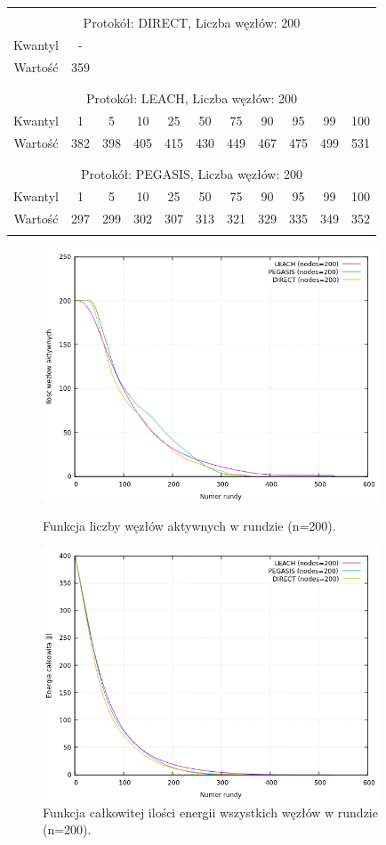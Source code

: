 \documentclass[a4paper,12pt,twoside,openany]{report}
\begin{document}
\begin{longtable}{*{11}{c}}
\toprule \\*
\multicolumn{11}{c}{Protokół: DIRECT, Liczba węzłów: 200} \\*
Kwantyl	& -	\\*
Wartość	& 359	\\*
\midrule \\*
\\*
\multicolumn{11}{c}{Protokół: LEACH, Liczba węzłów: 200} \\*
Kwantyl	& 1	& 5	& 10	& 25	& 50	& 75	& 90	& 95	& 99	& 100	\\*
Wartość	& 382	& 398	& 405	& 415	& 430	& 449	& 467	& 475	& 499	& 531	\\*
\midrule \\*
\\*
\multicolumn{11}{c}{Protokół: PEGASIS, Liczba węzłów: 200} \\*
Kwantyl	& 1	& 5	& 10	& 25	& 50	& 75	& 90	& 95	& 99	& 100	\\*
Wartość	& 297	& 299	& 302	& 307	& 313	& 321	& 329	& 335	& 349	& 352	\\*
\bottomrule \\*
\end{longtable}

\begin{figure}[H]
 \centering
 \includegraphics[width=10cm]{images/gnuplot/test_2/nodes_in_round_200.png}
 \caption{Funkcja liczby węzłów aktywnych w rundzie (n=200).}
 \includegraphics[width=10cm]{images/gnuplot/test_2/energy_in_round_200.png}
 \caption{Funkcja całkowitej ilości energii wszystkich węzłów w rundzie (n=200).}
\end{figure}
\end{document}
